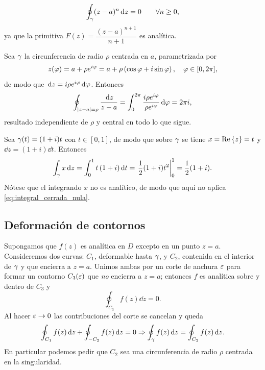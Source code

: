 \begin{ejemplo}
  \label{ej:potencias_cerrada}
  \begin{equation}
    \label{eq:potencias_cerrada}
    \oint_{\gamma}(z-a)^n\,\mathrm{d} z=0
    \qquad\forall n\ge 0,
  \end{equation}
  ya que la primitiva $F(z)=\dfrac{(z-a)^{n+1}}{n+1}$ es anal\'itica.
\end{ejemplo}

\begin{ejemplo}[El caso $n=-1$]
  \label{ej:integral_fundamental}
  Sea $\gamma$ la circunferencia de radio $\rho$ centrada en $a$, parametrizada
  por
  \begin{equation}
    \label{eq:parametrizacion_circulo}
    z(\varphi)=a+\rho e^{i\varphi}
      =a+\rho\left( \cos\varphi+i\sin\varphi \right),
    \quad\varphi\in[0,2\pi],
  \end{equation}
  de modo que $\,\mathrm{d} z=i\rho e^{i\varphi}\,\mathrm{d}\varphi$. Entonces
  \begin{equation}
    \label{eq:integral_fundamental}
    \oint_{\lvert z-a \rvert=\rho}\frac{\,\mathrm{d} z}{z-a}
      =\int_{0}^{2\pi}\frac{i\rho e^{i\varphi}}{\rho e^{i\varphi}}\,\mathrm{d}\varphi
      =2\pi i ,
  \end{equation}
  resultado independiente de $\rho$ y central en todo lo que sigue.
\end{ejemplo}

\begin{ejemplo}
  \label{ej:integral_recta}
  Sea $\gamma(t)=(1+i)t$ con $t\in[0,1]$, de modo que sobre $\gamma$ se tiene
  $x=\operatorname{Re}\left\{ z \right\}=t$ y $\dd z=(1+i)\dd t$. Entonces
  \begin{equation}
    \label{eq:integral_recta}
    \int_{\gamma}x\,\mathrm{d} z=\int_{0}^{1}t\,(1+i)\,\mathrm{d} t
      =\left. \frac{1}{2}(1+i)t^2 \right|_{0}^{1}=\frac{1}{2}(1+i).
  \end{equation}
  N\'otese que el integrando $x$ no es anal\'itico, de modo que aqu\'i no
  aplica \eqref{eq:integral_cerrada_nula}.
\end{ejemplo}

\subsection{Deformaci\'on de contornos}
\label{subsec:deformacion_contornos}

Supongamos que $f(z)$ es anal\'itica en $D$ excepto en un punto $z=a$.
Consideremos dos curvas: $C_1$, deformable hasta $\gamma$, y $C_2$, contenida en
el interior de $\gamma$ y que encierra a $z=a$. Unimos ambas por un corte de
anchura $\varepsilon$ para formar un contorno $C_3(\varepsilon)$ que \emph{no} encierra a
$z=a$; entonces $f$ es anal\'itica sobre y dentro de $C_3$ y
\begin{equation}
  \label{eq:contorno_C3}
  \oint_{C_3}f(z)\dd z=0 .
\end{equation}
Al hacer $\varepsilon\rightarrow 0$ las contribuciones del corte se cancelan y queda
\begin{equation}
  \label{eq:deformacion}
  \oint_{C_1}f(z)\,\mathrm{d} z+\oint_{-C_2}f(z)\,\mathrm{d} z=0
  \Rightarrow
  \oint_{\gamma}f(z)\,\mathrm{d} z=\oint_{C_2}f(z)\,\mathrm{d} z .
\end{equation}
En particular podemos pedir que $C_2$ sea una circunferencia de radio $\rho$
centrada en la singularidad.

